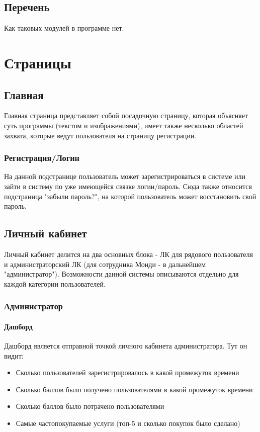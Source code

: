 \documentclass[DIV=calc, paper=a4, fontsize=11pt]{scrartcl} %
\begin{document}
\subsection{Перечень}

Как таковых модулей в программе нет.

\section{Страницы}

\subsection{Главная}

Главная страница представляет собой посадочную страницу, которая объясняет суть программы (текстом и изображениями), имеет также несколько областей захвата, которые ведут пользователя на страницу регистрации.

\subsubsection{Регистрация/Логин}
На данной подстранице пользователь может зарегистрироваться в системе или зайти в систему по уже имеющейся связке логин/пароль. Сюда также относится подстраница "забыли пароль?", на которой пользователь может восстановить свой пароль.

\subsection{Личный кабинет}

Личный кабинет делится на два основных блока - ЛК для рядового пользователя и администраторский ЛК (для сотрудника Монди - в дальнейшем "администратор"). Возможности данной системы описываются отдельно для каждой категории пользователей.

\subsubsection{Администратор}

\paragraph{Дашборд}

Дашборд является отправной точкой личного кабинета администратора. Тут он видит:

\begin{itemize}
	\item Сколько пользователей зарегистрировалось в какой промежуток времени
	\item Сколько баллов было получено пользователями в какой промежуток времени
	\item Сколько баллов было потрачено пользователями
	\item Самые частопокупаемые услуги (топ-5 и сколько покупок было сделано)
\end{itemize}
\end{document}
